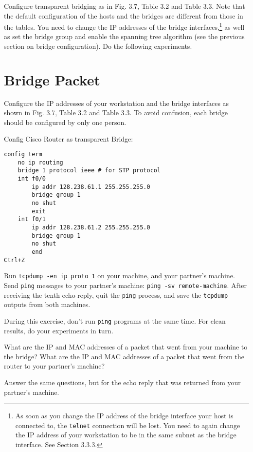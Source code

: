\documentclass{../UTNetLab}
\begin{document}
    Configure transparent bridging as in Fig.
    3.7, Table 3.2 and Table 3.3.
    Note that the default configuration of the hosts and the bridges are different from those in the tables.
    You need to change the IP addresses of the bridge interfaces,\footnote{As soon as you change the IP address of the bridge interface your host is connected to, the \lstinline{telnet} connection will be lost.
    You need to again change the IP address of your workstation to be in the same subnet as the bridge interface. See Section 3.3.3.} as well as set the bridge group and enable the spanning tree algorithm (see the previous section on bridge configuration).
    Do the following experiments.

\section{Bridge Packet}
    Configure the IP addresses of your workstation and the bridge interfaces as shown in Fig. 3.7, Table 3.2 and Table 3.3.
    To avoid confusion, each bridge should be configured by only one person.

    Config Cisco Router as transparent Bridge:
    \begin{lstlisting}[language={cisco}]
config term
    no ip routing
    bridge 1 protocol ieee # for STP protocol
    int f0/0
        ip addr 128.238.61.1 255.255.255.0
        bridge-group 1
        no shut
        exit
    int f0/1
        ip addr 128.238.61.2 255.255.255.0
        bridge-group 1
        no shut
        end
Ctrl+Z
    \end{lstlisting}
    
    Run \lstinline{tcpdump -en ip proto 1} on your machine, and your partner’s machine. Send \lstinline{ping} messages to your partner’s machine: \lstinline[emph={remote-machine}]{ping -sv remote-machine}.
    After receiving the tenth echo reply, quit the \lstinline{ping} process, and save the \lstinline{tcpdump} outputs from both machines.

    During this exercise, don’t run \lstinline{ping} programs at the same time. For clean results, do your experiments in turn.
    
    \begin{report}
    \item What are the IP and MAC addresses of a packet that went from your machine to the bridge?
    What are the IP and MAC addresses of a packet that went from the router to your partner’s machine?

    \item Answer the same questions, but for the echo reply that was returned from your partner’s machine.
    \end{report}
\end{document}
